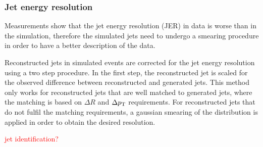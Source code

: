 \subsubsection{Jet energy resolution}
Measurements show that the jet energy resolution (JER) in data is worse than in the simulation, therefore the simulated jets need to undergo a smearing procedure in order to have a better description of the data. 

Reconstructed jets in simulated events are corrected for the jet energy resolution using a two step procedure. In the first step, the reconstructed jet \pt is scaled for the observed \pt difference between reconstructed and generated jets. This method only works for reconstructed jets that are well matched to generated jets, where the matching is based on $\Delta R$ and $\Delta p_\mathrm{T}$ requirements. For reconstructed jets that do not fulfil the matching requirements, a gaussian smearing of the \pt distribution is applied in order to obtain the desired resolution.

\textcolor{red}{jet identification?}
